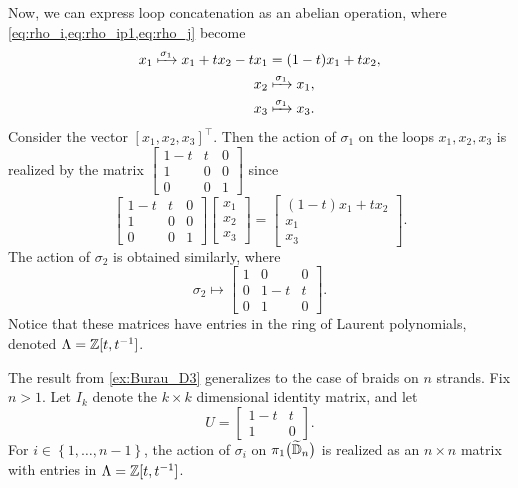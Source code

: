 \begin{example}
    Now, we can express loop concatenation as an abelian operation, where \cref{eq:rho_i,eq:rho_ip1,eq:rho_j} become
    \begin{align}
        x_1 \xmapsto{\sigma_1} x_1 + tx_2 - tx_1 &= (1-t)x_1 + tx_2, \\
        x_{2} &\xmapsto{\sigma_1} x_1, \\
        x_3 &\xmapsto{\sigma_1} x_3.
    \end{align}
    Consider the vector $[x_1, x_2, x_3]^\top$. Then the action of $\sigma_1$ on the loops $x_1,x_2,x_3$ is realized by the matrix $\begin{bmatrix}
        1-t & t & 0 \\ 1 & 0 & 0 \\ 0 & 0 & 1
    \end{bmatrix}$ since
    \begin{equation}
        \begin{bmatrix}
            1-t & t & 0 \\ 1 & 0 & 0 \\ 0 & 0 & 1
        \end{bmatrix}\begin{bmatrix}
            x_1 \\ x_2 \\ x_3
        \end{bmatrix} = \begin{bmatrix}
            (1-t)x_1 + tx_2 \\ x_1 \\ x_3
        \end{bmatrix}.
    \end{equation}
    The action of $\sigma_2$ is obtained similarly, where
    \begin{equation}
        \sigma_2 \mapsto \begin{bmatrix}
            1 & 0 & 0 \\ 0 & 1-t & t \\ 0 & 1 & 0
        \end{bmatrix}.
    \end{equation}
    Notice that these matrices have entries in the ring of Laurent polynomials, denoted $\Lambda=\mathbb{Z}[t,{ t }^{-1}]$.
\end{example}

The result from \cref{ex:Burau_D3} generalizes to the case of braids on $n$ strands. Fix $n>1$. Let $I_k$ denote the $k\times k$ dimensional identity matrix, and let
\begin{equation}
    U=\begin{bmatrix}
        1-t & t \\ 1 & 0
    \end{bmatrix}.
\end{equation} 
For $i\in\left\{ 1,\dots,n-1 \right\}$, the action of $\sigma_i$ on $\pi_1\bigl( \widetilde{\mathbb{D}}_n \bigr)$ is realized as an $n\times n$ matrix with entries in $\Lambda = \mathbb{Z}[t,{ t }^{-1}]$. 

